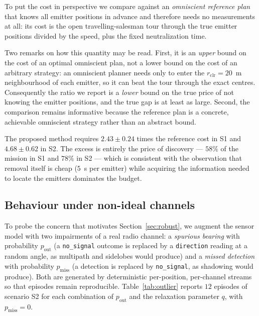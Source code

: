 \documentclass[preprint,12pt,3p]{elsarticle}
\theoremstyle{definition}
\begin{document}
To put the cost in perspective we compare against an \emph{omniscient reference plan} that knows
all emitter positions in advance and therefore needs no measurements at all: its cost is the open
travelling-salesman tour through the true emitter positions divided by the speed, plus the fixed
neutralization time.

Two remarks on how this quantity may be read. First, it is an \emph{upper} bound on the cost of an
optimal omniscient plan, not a lower bound on the cost of an arbitrary strategy: an omniscient
planner needs only to enter the $r_{\mathrm{clr}}=20$~m neighbourhood of each emitter, so it can
beat the tour through the exact centres. Consequently the ratio we report is a \emph{lower} bound
on the true price of not knowing the emitter positions, and the true gap is at least as large.
Second, the comparison remains informative because the reference plan is a concrete, achievable
omniscient strategy rather than an abstract bound.

The proposed method requires $2.43\pm0.24$ times the reference cost in S1 and $4.68\pm0.62$ in S2. The excess is entirely the price
of discovery --- $58\%$ of the mission in S1 and $78\%$ in S2 --- which is consistent with the
observation that removal itself is cheap ($5$~s per emitter) while acquiring the information
needed to locate the emitters dominates the budget.


\subsection{Behaviour under non-ideal channels}
\label{sec:outlier}

To probe the concern that motivates Section~\ref{sec:robust}, we augment the sensor model with two
impairments of a real radio channel: a \emph{spurious bearing} with probability $p_{\mathrm{out}}$
(a \texttt{no\_signal} outcome is replaced by a \texttt{direction} reading at a random angle, as
multipath and sidelobes would produce) and a \emph{missed detection} with probability
$p_{\mathrm{miss}}$ (a detection is replaced by \texttt{no\_signal}, as shadowing would produce).
Both are generated by deterministic per-position, per-channel streams so that episodes remain
reproducible. Table~\ref{tab:outlier} reports $12$ episodes of scenario S2 for each combination of
$p_{\mathrm{out}}$ and the relaxation parameter $q$, with $p_{\mathrm{miss}}=0$.
\end{document}
